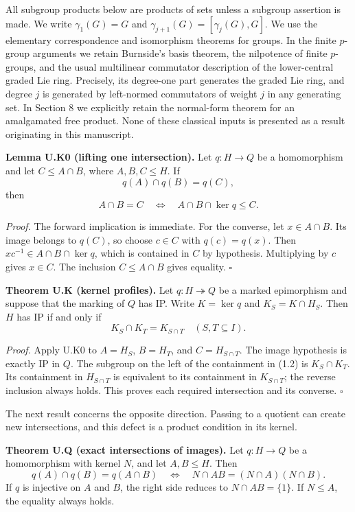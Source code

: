 \documentclass[
  11pt,
  a4paper,
]{article}
\begin{document}
All subgroup products below are products of sets unless a subgroup
assertion is made. We write \(\gamma_1(G)=G\) and
\(\gamma_{j+1}(G)=[\gamma_j(G),G]\). We use the elementary
correspondence and isomorphism theorems for groups. In the finite
\(p\)-group arguments we retain Burnside's basis theorem, the nilpotence
of finite \(p\)-groups, and the usual multilinear commutator description
of the lower-central graded Lie ring. Precisely, its degree-one part
generates the graded Lie ring, and degree \(j\) is generated by
left-normed commutators of weight \(j\) in any generating set. In
Section 8 we explicitly retain the normal-form theorem for an
amalgamated free product. None of these classical inputs is presented as
a result originating in this manuscript.

\textbf{Lemma U.K0 (lifting one intersection).} Let \(q:H\to Q\) be a
homomorphism and let \(C\leq A\cap B\), where \(A,B,C\leq H\). If \[
q(A)\cap q(B)=q(C),
\] then \[
A\cap B=C\quad\Longleftrightarrow\quad A\cap B\cap\ker q\leq C.
\tag{1.2}
\]

\emph{Proof.} The forward implication is immediate. For the converse,
let \(x\in A\cap B\). Its image belongs to \(q(C)\), so choose
\(c\in C\) with \(q(c)=q(x)\). Then \(xc^{-1}\in A\cap B\cap\ker q\),
which is contained in \(C\) by hypothesis. Multiplying by \(c\) gives
\(x\in C\). The inclusion \(C\leq A\cap B\) gives equality. \(\square\)

\textbf{Theorem U.K (kernel profiles).} Let \(q:H\twoheadrightarrow Q\)
be a marked epimorphism and suppose that the marking of \(Q\) has IP.
Write \(K=\ker q\) and \(K_S=K\cap H_S\). Then \(H\) has IP if and only
if \[
K_S\cap K_T=K_{S\cap T}\quad(S,T\subseteq I).
\tag{1.3}
\]

\emph{Proof.} Apply U.K0 to \(A=H_S\), \(B=H_T\), and \(C=H_{S\cap T}\).
The image hypothesis is exactly IP in \(Q\). The subgroup on the left of
the containment in (1.2) is \(K_S\cap K_T\). Its containment in
\(H_{S\cap T}\) is equivalent to its containment in \(K_{S\cap T}\); the
reverse inclusion always holds. This proves each required intersection
and its converse. \(\square\)

The next result concerns the opposite direction. Passing to a quotient
can create new intersections, and this defect is a product condition in
its kernel.

\textbf{Theorem U.Q (exact intersections of images).} Let \(q:H\to Q\)
be a homomorphism with kernel \(N\), and let \(A,B\leq H\). Then \[
q(A)\cap q(B)=q(A\cap B)
\quad\Longleftrightarrow\quad
N\cap AB=(N\cap A)(N\cap B).
\tag{1.4}
\] If \(q\) is injective on \(A\) and \(B\), the right side reduces to
\(N\cap AB=\{1\}\). If \(N\leq A\), the equality always holds.
\end{document}
